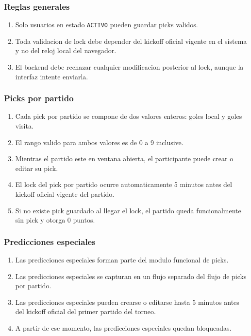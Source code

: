 \subsubsection{Reglas generales}

\begin{enumerate}
  \item Solo usuarios en estado \texttt{ACTIVO} pueden guardar picks validos.
  \item Toda validacion de lock debe depender del kickoff oficial vigente en el sistema y no del reloj local del navegador.
  \item El backend debe rechazar cualquier modificacion posterior al lock, aunque la interfaz intente enviarla.
\end{enumerate}

\subsubsection{Picks por partido}

\begin{enumerate}
  \item Cada pick por partido se compone de dos valores enteros: goles local y goles visita.
  \item El rango valido para ambos valores es de 0 a 9 inclusive.
  \item Mientras el partido este en ventana abierta, el participante puede crear o editar su pick.
  \item El lock del pick por partido ocurre automaticamente 5 minutos antes del kickoff oficial vigente del partido.
  \item Si no existe pick guardado al llegar el lock, el partido queda funcionalmente sin pick y otorga 0 puntos.
\end{enumerate}

\subsubsection{Predicciones especiales}

\begin{enumerate}
  \item Las predicciones especiales forman parte del modulo funcional de picks.
  \item Las predicciones especiales se capturan en un flujo separado del flujo de picks por partido.
  \item Las predicciones especiales pueden crearse o editarse hasta 5 minutos antes del kickoff oficial del primer partido del torneo.
  \item A partir de ese momento, las predicciones especiales quedan bloqueadas.
\end{enumerate}

